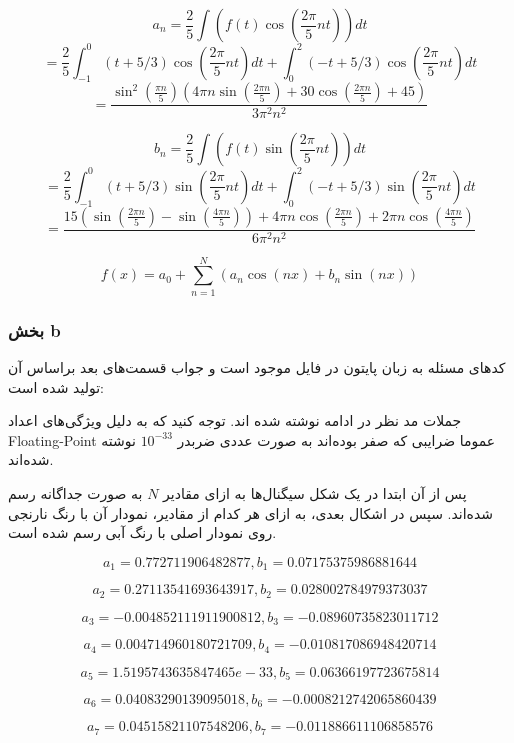 \documentclass[12pt]{article}
\begin{document}
$$a_n = \frac{2}{5} \int (f(t) \cos (\frac{2\pi}{5} n t)) dt$$
$$ =\frac{2}{5} \int_{-1}^{0} (t+5/3) \cos(\frac{2 \pi}{5} n t) dt + \int_{0}^{2} (-t + 5/3) \cos (\frac{2 \pi}{5} n t) dt$$
$$= \frac{\sin ^2\left(\frac{\pi  n}{5}\right) \left(4 \pi  n \sin \left(\frac{2 \pi  n}{5}\right)+30 \cos \left(\frac{2 \pi  n}{5}\right)+45\right)}{3 \pi ^2 n^2}$$


$$b_n = \frac{2}{5} \int (f(t) \sin (\frac{2\pi}{5} n t)) dt$$
$$ =\frac{2}{5} \int_{-1}^{0} (t+5/3) \sin(\frac{2 \pi}{5} n t) dt + \int_{0}^{2} (-t + 5/3) \sin (\frac{2 \pi}{5} n t) dt$$
$$= \frac{15 \left(\sin \left(\frac{2 \pi  n}{5}\right)-\sin \left(\frac{4 \pi  n}{5}\right)\right)+4 \pi  n \cos \left(\frac{2 \pi  n}{5}\right)+2 \pi  n \cos \left(\frac{4 \pi  n}{5}\right)}{6 \pi ^2 n^2}$$



$$f(x) = a_0 + \sum_{n=1}^{N} (a_n \cos (n x) + b_n \sin (n x))$$




\subsubsection{بخش b}

کدهای مسئله به زبان پایتون در فایل 
موجود است و جواب قسمت‌های بعد براساس آن تولید شده است:

جملات مد نظر در ادامه نوشته شده اند. توجه کنید که به دلیل ویژگی‌های اعداد Floating-Point عموما ضرایبی که صفر بوده‌اند به صورت عددی ضربدر $10^{-33}$ نوشته شده‌اند.

پس از آن ابتدا در یک شکل سیگنال‌ها به ازای مقادیر $N$ به صورت جداگانه رسم شده‌اند. سپس در اشکال بعدی، به ازای هر کدام از مقادیر، نمودار آن با رنگ نارنجی روی نمودار اصلی با رنگ آبی رسم شده است.



$$a_{ 1 } = 0.772711906482877 , b_{ 1 } = 0.07175375986881644$$

$$a_{ 2 } = 0.27113541693643917 , b_{ 2 } = 0.028002784979373037$$

$$a_{ 3 } = -0.004852111911900812 , b_{ 3 } = -0.08960735823011712$$

$$a_{ 4 } = 0.004714960180721709 , b_{ 4 } = -0.010817086948420714$$

$$a_{ 5 } = 1.5195743635847465e-33 , b_{ 5 } = 0.06366197723675814$$

$$a_{ 6 } = 0.04083290139095018 , b_{ 6 } = -0.0008212742065860439$$

$$a_{ 7 } = 0.04515821107548206 , b_{ 7 } = -0.011886611106858576$$
\end{document}
